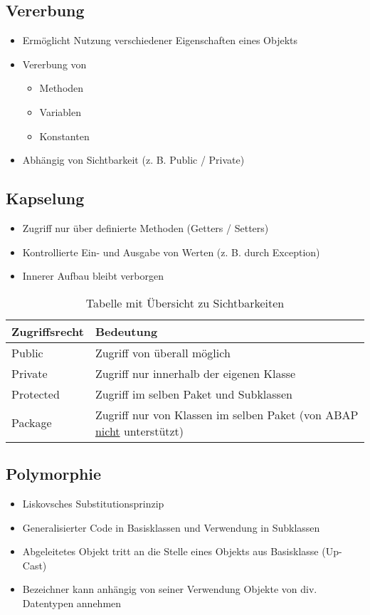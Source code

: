 \subsection{Vererbung}
\begin{itemize}
    \item Ermöglicht Nutzung verschiedener Eigenschaften eines Objekts
    \item Vererbung von
    \begin{itemize}
        \item Methoden
        \item Variablen
        \item Konstanten
    \end{itemize}
    \item Abhängig von Sichtbarkeit (z. B. Public / Private)
\end{itemize}

\subsection{Kapselung}
\begin{itemize}
    \item Zugriff nur über definierte Methoden (Getters / Setters)
    \item Kontrollierte Ein- und Ausgabe von Werten (z. B. durch Exception)
    \item Innerer Aufbau bleibt verborgen
\end{itemize}

\begin{table}[h!]
    \begin{tabular}{ l l }
        \hline
        \textbf{Zugriffsrecht} & \textbf{Bedeutung} \\ \hline
        Public & Zugriff von überall möglich \\ \hline
        Private & Zugriff nur innerhalb der eigenen Klasse \\ \hline 
        Protected & Zugriff im selben Paket und Subklassen \\ \hline
        Package & Zugriff nur von Klassen im selben Paket (von ABAP \underline{nicht} unterstützt) \\ 
        \hline
    \end{tabular}
    \caption{Tabelle mit Übersicht zu Sichtbarkeiten}
    \label{table:1}
\end{table}

\subsection{Polymorphie}
\begin{itemize}
    \item Liskovsches Substitutionsprinzip
    \item Generalisierter Code in Basisklassen und Verwendung in Subklassen
    \item Abgeleitetes Objekt tritt an die Stelle eines Objekts aus Basisklasse (Up-Cast)
    \item Bezeichner kann anhängig von seiner Verwendung Objekte von div. Datentypen annehmen
\end{itemize}
\newpage